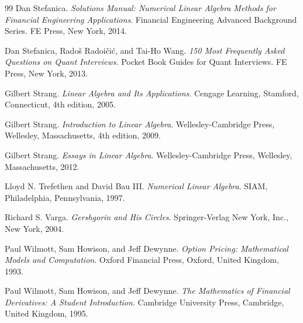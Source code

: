 \begin{thebibliography}{99}
 Dan Stefanica. \textit{Solutions Manual: Numerical Linear
Algebra Methods for Financial Engineering Applications}. Financial
Engineering Advanced Background Series. FE Press, New York, 2014.

 Dan Stefanica, Radoš Radoičić, and Tai-Ho Wang. \textit{150
Most Frequently Asked Questions on Quant Interviews}. Pocket Book Guides
for Quant Interviews. FE Press, New York, 2013.

 Gilbert Strang. \textit{Linear Algebra and Its Applications}.
Cengage Learning, Stamford, Connecticut, 4th edition, 2005.

 Gilbert Strang. \textit{Introduction to Linear Algebra}.
Wellesley-Cambridge Press, Wellesley, Massachusetts, 4th edition, 2009.

 Gilbert Strang. \textit{Essays in Linear Algebra}.
Wellesley-Cambridge Press, Wellesley, Massachusetts, 2012.

 Lloyd N. Trefethen and David Bau III. \textit{Numerical
Linear Algebra}. SIAM, Philadelphia, Pennsylvania, 1997.

 Richard S. Varga. \textit{Gershgorin and His Circles}.
Springer-Verlag New York, Inc., New York, 2004.

 Paul Wilmott, Sam Howison, and Jeff Dewynne. \textit{Option
Pricing: Mathematical Models and Computation}. Oxford Financial Press,
Oxford, United Kingdom, 1993.

 Paul Wilmott, Sam Howison, and Jeff Dewynne. \textit{The
Mathematics of Financial Derivatives: A Student Introduction}. Cambridge
University Press, Cambridge, United Kingdom, 1995.

\end{thebibliography}
